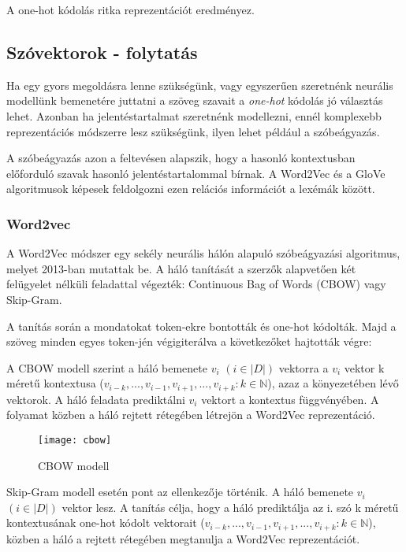 \begin{note}
	A one-hot kódolás ritka reprezentációt eredményez.
\end{note}

\subsection*{Szóvektorok - folytatás}
Ha egy gyors megoldásra lenne szükségünk, vagy egyszerűen szeretnénk neurális modellünk bemenetére juttatni a szöveg szavait a \textit{one-hot} kódolás jó választás lehet. Azonban ha jelentéstartalmat szeretnénk modellezni, ennél komplexebb reprezentációs módszerre lesz szükségünk, ilyen lehet például a szóbeágyazás.

A szóbeágyazás azon a feltevésen alapszik, hogy a hasonló kontextusban előforduló szavak hasonló jelentéstartalommal bírnak. A Word2Vec és a GloVe algoritmusok képesek feldolgozni ezen relációs információt a lexémák között.

\subsubsection{Word2vec}
A Word2Vec módszer egy sekély neurális hálón alapuló szóbeágyazási algoritmus, melyet 2013-ban mutattak be. A háló tanítását a szerzők alapvetően két felügyelet nélküli feladattal végezték: Continuous Bag of Words (CBOW) vagy Skip-Gram.

A tanítás során a mondatokat token-ekre bontották és one-hot kódolták. Majd a szöveg minden egyes token-jén végigiterálva a következőket hajtották végre:

A CBOW modell szerint a háló bemenete $v_i$
$\left( i \in \left|D\right| \right)$ vektorra a $v_i$ vektor k méretű kontextusa ($v_{i-k},...,v_{i-1}, v_{i+1},..., v_{i+k} : k \in \mathbb{N}$), azaz a könyezetében lévő vektorok. A háló feladata prediktálni $v_i$ vektort a kontextus függvényében. A folyamat közben a háló rejtett rétegében létrejön a Word2Vec reprezentáció.

\begin{figure}[H]
	\centering
	\texttt{[image: cbow]}
	\caption{CBOW modell}
\end{figure}

Skip-Gram modell esetén pont az ellenkezője történik. A háló bemenete $v_i$
$\left( i \in \left|D\right| \right)$ vektor lesz. A tanítás célja, hogy a háló prediktálja az i. szó k méretű kontextusának one-hot kódolt vektorait ($v_{i-k},...,v_{i-1}, v_{i+1},..., v_{i+k} : k \in \mathbb{N}$), közben a háló a rejtett rétegében megtanulja a Word2Vec reprezentációt.


